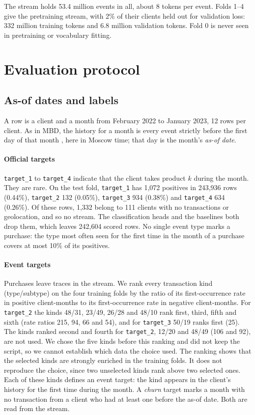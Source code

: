 \documentclass[12pt]{article}
\newcommand{\tok}[1]{\texttt{#1}}
\begin{document}
The stream holds 53.4 million events in all, about 8 tokens per event. Folds 1--4 give the pretraining stream, with 2\% of their clients held out for validation loss: 332 million training tokens and 6.8 million validation tokens. Fold 0 is never seen in pretraining or vocabulary fitting.

\section{Evaluation protocol}\label{sec:protocol}

\subsection{As-of dates and labels}

A row is a client and a month from February 2022 to January 2023, 12 rows per client. As in MBD, the history for a month is every event strictly before the first day of that month \cite{mbd}, here in Moscow time; that day is the month's \emph{as-of date}.

\paragraph{Official targets} \tok{target\_1} to \tok{target\_4} indicate that the client takes product $k$ during the month. They are rare. On the test fold, \tok{target\_1} has 1,072 positives in 243,936 rows (0.44\%), \tok{target\_2} 132 (0.05\%), \tok{target\_3} 934 (0.38\%) and \tok{target\_4} 634 (0.26\%). Of these rows, 1,332 belong to 111 clients with no transactions or geolocation, and so no stream. The classification heads and the baselines both drop them, which leaves 242,604 scored rows. No single event type marks a purchase: the type most often seen for the first time in the month of a purchase covers at most 10\% of its positives.

\paragraph{Event targets} Purchases leave traces in the stream. We rank every transaction kind (type/subtype) on the four training folds by the ratio of its first-occurrence rate in positive client-months to its first-occurrence rate in negative client-months. For \tok{target\_2} the kinds 48/31, 23/49, 26/28 and 48/10 rank first, third, fifth and sixth (rate ratios 215, 94, 66 and 54), and for \tok{target\_3} 50/19 ranks first (25). The kinds ranked second and fourth for \tok{target\_2}, 12/20 and 48/49 (106 and 92), are not used. We chose the five kinds before this ranking and did not keep the script, so we cannot establish which data the choice used. The ranking shows that the selected kinds are strongly enriched in the training folds. It does not reproduce the choice, since two unselected kinds rank above two selected ones. Each of these kinds defines an event target: the kind appears in the client's history for the first time during the month. A \emph{churn} target marks a month with no transaction from a client who had at least one before the as-of date. Both are read from the stream.
\end{document}
